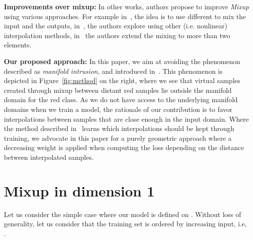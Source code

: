 \documentclass[twoside]{article}
\numberwithin{intassumption}{assumption}
\begin{document}
\textbf{Improvements over mixup:}
In other works, authors propose to improve \emph{Mixup} using various approaches. For example in~\citep{remix}, the idea is to use different  to mix the input and the outputs, in~\citep{automix,mixmo,cutmixorig}, the authors explore using other (i.e. nonlinear) interpolation methods, in~\citep{batchmixup,kmixup,stackmix} the authors extend the mixing to more than two elements.




\textbf{Our proposed approach:}
In this paper, we aim at avoiding the phenomenon described as \emph{manifold intrusion}, and introduced in~\citep{guo2019mixup}. This phenomenon is depicted in Figure~\ref{fig:method} on the right, where we see that virtual samples created through mixup between distant red samples lie outside the manifold domain for the red class. As we do not have access to the underlying manifold domains when we train a model, the rationale of our contribution is to favor interpolations between samples that are close enough in the input domain. Where the method described in~\citep{guo2019mixup} learns which interpolations should be kept through training, we advocate in this paper for a purely geometric approach where a decreasing weight is applied when computing the loss depending on the distance between interpolated samples.







\section{Mixup in dimension 1}\label{theomixup}

Let us consider the simple case where our model  is defined on . Without loss of generality, let us consider that the training set  is ordered by increasing input, i.e, .
\end{document}
